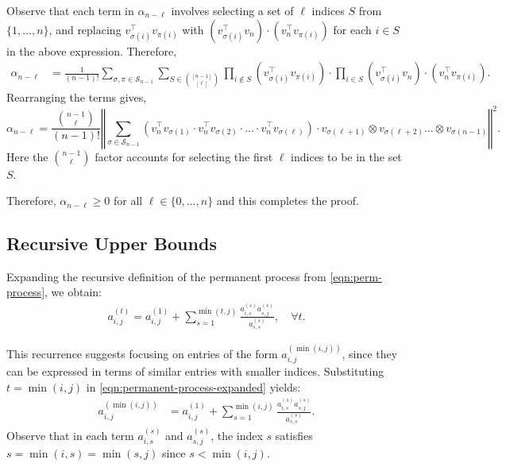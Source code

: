 \documentclass[11pt]{article}
\makeatletter
\theoremstyle{definition}
\newenvironment{proof}[1][\protect\proofname]{\par
	\normalfont\topsep6\p@\@plus6\p@\relax
	\trivlist
	\itemindent\parindent        %
	\item[\hskip\labelsep\scshape #1]\ignorespaces
}{%
	\endtrivlist\@endpefalse
}
\providecommand{\proofname}{Proof}
\newcommand{\norm}[1]{\left\Vert#1\right\Vert}           %
\makeatother
\begin{document}
\begin{proof}
Observe that each term in $\alpha_{n-\ell}$ involves selecting a set of $\ell$ indices $S$ from $\{1, \ldots, n\}$,  and replacing $v_{\sigma(i)}^\top v_{\pi(i)}$ with $(v_{\sigma(i)}^\top v_n) \cdot (v_n^\top v_{\pi(i)})$ for each $i \in S$ in the above expression.
Therefore, 
\begin{align*}
    \alpha_{n-\ell} 
    &= \frac{1}{(n-1)!}   \sum_{\sigma, \pi \in \mathcal{S}_{n-1}} \sum_{S \in \binom{[n-1]}{[\ell]}}  \prod_{i \notin S} (v_{\sigma(i)}^\top v_{\pi(i)})  \cdot \prod_{i \in S} (v_{\sigma(i)}^\top v_n) \cdot (v_n^\top v_{\pi(i)}).
\end{align*}
Rearranging the terms gives,
    \begin{equation*}
        \alpha_{n-\ell} = \frac{\binom{n-1}{\ell}}{(n-1)!} \norm{\sum_{\sigma \in \mathcal{S}_{n-1}} \left( v_n^\top v_{\sigma(1)} \cdot v_n^\top v_{\sigma(2)} \cdot\ldots\cdot v_n^\top v_{\sigma(\ell)}\right)  \cdot  v_{\sigma(\ell+1)} \otimes v_{\sigma(\ell+2)} \ldots  \otimes v_{\sigma(n-1)} }^2.
    \end{equation*}
    Here the $\binom{n-1}{\ell}$ factor accounts for selecting the first $\ell$ indices to be in the set $S$.
    
    Therefore, $\alpha_{n-\ell} \geq 0$ for all $\ell \in \{0, \ldots, n\}$ and this completes the proof.
\end{proof}


\subsection{Recursive Upper Bounds}
Expanding the recursive definition of the permanent process from \eqref{eqn:perm-process}, we obtain:
\begin{align}
	\label{eqn:permanent-process-expanded}
	a_{i,j}^{(t)} = a_{i,j}^{(1)} + \sum_{s=1}^{\min(t,j)} \frac{a_{i,s}^{(s)} a_{s,j}^{(s)}}{a_{s,s}^{(s)}}, \quad \forall t.
\end{align}

This recurrence suggests focusing on entries of the form \( a_{i,j}^{(\min(i,j))} \), since they can be expressed in terms of similar entries with smaller indices. Substituting \( t = \min(i,j) \) in \eqref{eqn:permanent-process-expanded} yields:
\begin{align}
	\label{eqn:permanent-process-expanded-special}
	a_{i,j}^{(\min(i,j))} 
	&= a_{i,j}^{(1)} + \sum_{s=1}^{\min(i,j)} \frac{a_{i,s}^{(s)} a_{s,j}^{(s)}}{a_{s,s}^{(s)}}.
\end{align}
Observe that in each term \( a_{i,s}^{(s)} \) and \( a_{s,j}^{(s)} \), the index \( s \) satisfies \( s = \min(i,s) = \min(s,j) \) since \( s < \min(i,j) \).
\end{document}
